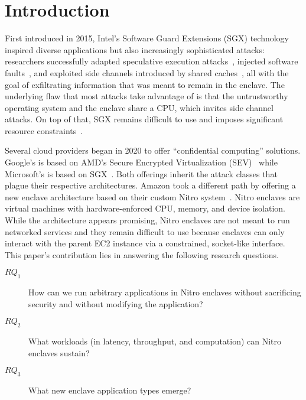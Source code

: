 \section{Introduction}

First introduced in 2015, Intel's Software Guard Extensions (SGX) technology
inspired diverse applications but also increasingly sophisticated attacks:
researchers successfully adapted speculative execution
attacks~\cite{VanBulck2018a}, injected software faults~\cite{Murdock2020a}, and
exploited side channels introduced by shared caches~\cite{Brasser2017a}, all
with the goal of exfiltrating information that was meant to remain in the
enclave.  The underlying flaw that most attacks take advantage of is that the
untrustworthy operating system and the enclave share a CPU, which invites side
channel attacks.  On top of that, SGX remains difficult to use and imposes
significant resource constraints~\cite{Ngoc2019a}.

Several cloud providers began in 2020 to offer ``confidential computing''
solutions.  Google's is based on AMD's Secure Encrypted Virtualization
(SEV)~\cite{googlecc} while Microsoft's is based on SGX~\cite{azurecc}.  Both
offerings inherit the attack classes that plague their respective architectures.
Amazon took a different path by offering a new enclave architecture based on
their custom Nitro system~\cite{nitro-enclaves}.  Nitro enclaves are
virtual machines with hardware-enforced CPU, memory, and device isolation.
%
While the architecture appears promising, Nitro enclaves are not meant to run
networked services and they remain difficult to use because enclaves can only
interact with the parent EC2 instance via a constrained, socket-like interface.
This paper's contribution lies in answering the following research questions.
\begin{description}

  \item[$RQ_1$] How can we run arbitrary applications in Nitro enclaves without
    sacrificing security and without modifying the application?

  \item[$RQ_2$] What workloads (in latency, throughput, and computation) can
    Nitro enclaves sustain?

  \item[$RQ_3$] What new enclave application types emerge?

\end{description}

